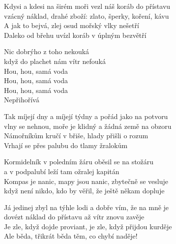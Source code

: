 
\ve{}
Kdysi a kdesi na širém moři vezl náš koráb do přístavu\\
vzácný náklad, drahé zboží: zlato, šperky, koření, kávu\\
A jak to bejvá, zlej osud mořský vlky nešetří\\
Daleko od břehu uvízl koráb v úplným bezvětří

\cho{}
Nic dobrýho z toho nekouká\\
když do plachet nám vítr nefouká\\
Hou, hou, samá voda\\
Hou, hou, samá voda\\
Hou, hou, samá voda\\
Nepřihořívá

\ve{}
Tak míjejí dny a míjejí týdny a pořád jako na potvoru\\
vlny se nehnou, moře je klidný a žádná země na obzoru\\
Námořníkům kručí v břiše, hlady přišli o rozum\\
Vrhají se přes palubu do tlamy žralokům

\vspace*{-2pt}
\cho{}

\ve{}
Kormidelník v poledním žáru oběsil se na stožáru\\
a v podpalubí leží tam ožralej kapitán\\
Kompas je nanic, mapy jsou nanic, zbytečně se vesluje\\
když není nikdo, kdo by věřil, že ještě někam dopluje

\vspace*{-2pt}
\cho{}

\ve{}
Já jedinej zbyl na týhle lodi a dobře vím, že na mně je\\
dovézt náklad do přístavu až vítr znovu zavěje\\
Je zle, když dojde proviant, je zle, když přijdou kurděje\\
Ale běda, třikrát běda těm, co chybí naděje!

\vspace*{-3pt}
\cho{}

\vspace*{-3pt}

\esong{}